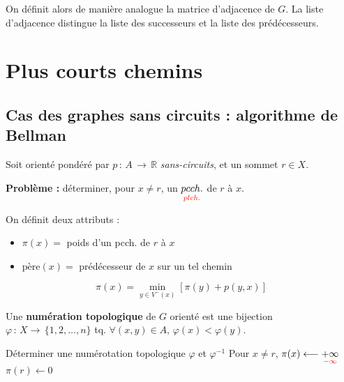 \documentclass[a4paper, 8pt]{article}
\begin{document}
\begin{multicols*}{3}
\begin{center}
\end{center}

On définit alors de manière analogue la matrice d'adjacence de $G$. La liste d'adjacence distingue la liste des successeurs et la liste des prédécesseurs. 

\section*{Plus courts chemins}

\subsection*{Cas des graphes sans circuits : algorithme de Bellman}

\newcommand{\pere}{\text{père}}
\newcommand{\Vm}{V^-}
\newcommand{\Vp}{V^+}
\newcommand{\tred}[1]{{\color{red}#1}}

Soit \GXA orienté pondéré par $p\,:\,A\,\rightarrow\,\mathbb{R}$ \emph{sans-circuits}, et un sommet $r\in X$.

\textbf{Problème :} déterminer, pour $x\neq r$, un $\underset{\tred{plch.}}{pcch.}$ de $r$ à $x$.

On définit deux attributs :
\begin{itemize}
\item $\pi(x) =$ poids d'un pcch. de $r$ à $x$
\item $\pere(x) =$ prédécesseur de $x$ sur un tel chemin
\end{itemize}

\[ \pi(x) = \displaystyle \min_{y\in \Vm(x)}\left[\pi(y) + p(y,x)\right] \]

Une \textbf{numération topologique} de $G$ orienté est une bijection $\varphi\,:\,X\rightarrow\,\{1,2,\ldots,n\}$ tq. $\forall (x,y)\in A, \,\varphi(x) < \varphi(y)$.


\begin{algorithm}[H]
 Déterminer une numérotation topologique $\varphi$ et $\varphi^{-1}$ \;
 Pour $x\neq r$, $\pi(x) \longleftarrow \underset{\tred{-\infty}}{+\infty}$\;
 $\pi(r) \longleftarrow 0$ \;
 

\end{algorithm}
\end{multicols*}
\end{document}
